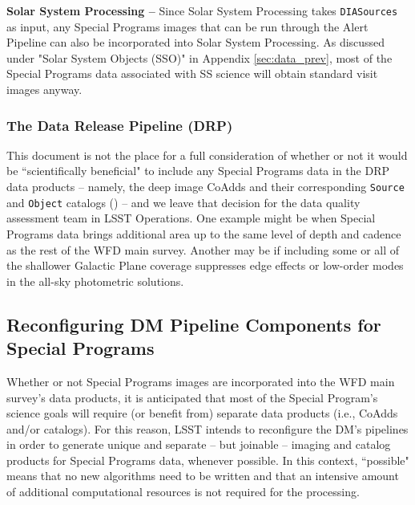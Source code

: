 \documentclass[DM,lsstdoc,toc]{lsstdoc}
\begin{document}
{\bf Solar System Processing -- } Since Solar System Processing takes \texttt{DIASources} as input, any Special Programs images that can be run through the Alert Pipeline can also be incorporated into Solar System Processing.
As discussed under "Solar System Objects (SSO)" in Appendix \ref{sec:data_prev}, most of the Special Programs data associated with SS science will obtain standard visit images anyway.

\subsubsection{The Data Release Pipeline (DRP)}\label{ssec:dmplans_drp}

This document is not the place for a full consideration of whether or not it would be ``scientifically beneficial" to include any Special Programs data in the DRP data products -- namely, the deep image CoAdds and their corresponding {\tt Source} and {\tt Object} catalogs () -- and we leave that decision for the data quality assessment team in LSST Operations. One example might be when Special Programs data brings additional area up to the same level of depth and cadence as the rest of the WFD main survey. Another may be if including some or all of the shallower Galactic Plane coverage suppresses edge effects or low-order modes in the all-sky photometric solutions.

\subsection{Reconfiguring DM Pipeline Components for Special Programs}\label{ssec:dmplans_reconfig}

Whether or not Special Programs images are incorporated into the WFD main survey's data products, it is anticipated that most of the Special Program's science goals will require (or benefit from) separate data products (i.e., CoAdds and/or catalogs). For this reason, LSST intends to reconfigure the DM's pipelines in order to generate unique and separate -- but joinable -- imaging and catalog products for Special Programs data, whenever possible. In this context, ``possible" means that no new algorithms need to be written and that an intensive amount of additional computational resources is not required for the processing.
\end{document}
